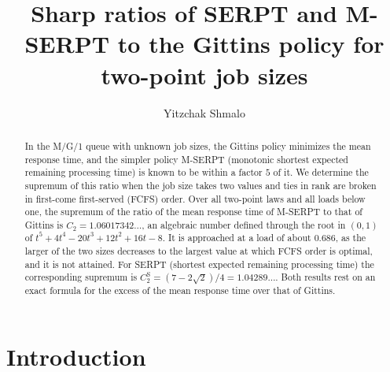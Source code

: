 \documentclass[11pt]{amsart}
\theoremstyle{remark}
\numberwithin{equation}{section}
\begin{document}
\title[SERPT and M-SERPT for two-point job sizes]{Sharp ratios of SERPT and M-SERPT to the Gittins policy for two-point job sizes}
\author{Yitzchak Shmalo}
\address{Einstein Institute of Mathematics, The Hebrew University of Jerusalem, Jerusalem, Israel}
\date{}


\begin{abstract}
In the M/G/1 queue with unknown job sizes, the Gittins policy minimizes
the mean response time, and the simpler policy M-SERPT (monotonic
shortest expected remaining processing time) is known to be within a
factor $5$ of it. We determine the supremum of this ratio when the
job size takes two values and ties in rank are broken in
first-come first-served (FCFS) order. Over all two-point laws and all
loads below one, the supremum of the ratio of the mean response time of
M-SERPT to that of Gittins is $C_2=1.06017342\ldots$, an algebraic number
defined through the root in $(0,1)$ of $t^5+4t^4-20t^3+12t^2+16t-8$. It
is approached at a load of about $0.686$, as the larger of the two sizes decreases to
the largest value at which FCFS order is optimal, and it is
not attained. For SERPT (shortest expected remaining processing time)
the corresponding supremum is
$C_2^{\mathrm S}=(7-2\sqrt2)/4=1.04289\ldots$. Both results rest on an exact formula for
the excess of the mean response time over that of Gittins.
\end{abstract}

\maketitle

\section{Introduction}
\end{document}
